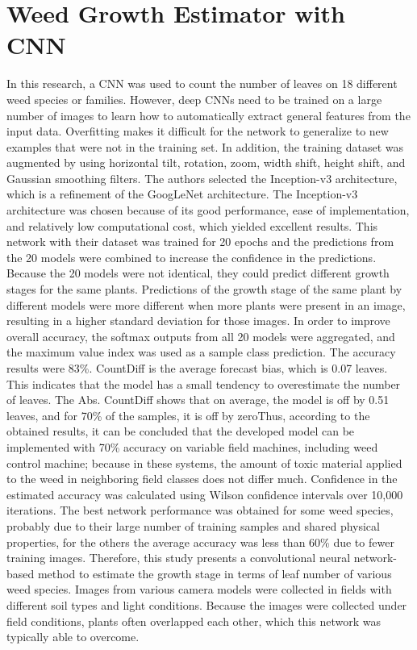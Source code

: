 \section {Weed Growth Estimator with CNN}
In this research, a CNN was used to count the number of leaves on 18 different weed species or families. However, deep CNNs need to be trained on a large number of images
to learn how to automatically extract general features from the input data. Overfitting makes it difficult for the network to generalize to new examples that were not in
the training set. In addition, the training dataset was augmented by using horizontal tilt, rotation, zoom, width shift, height shift, and Gaussian smoothing filters. The
authors selected the Inception-v3 architecture, which is a refinement of the GoogLeNet architecture. The Inception-v3 architecture was chosen because of its good
performance, ease of implementation, and relatively low computational cost, which yielded excellent results. This network with their dataset was trained for 20 epochs
and the predictions from the 20 models were combined to increase the confidence in the predictions. Because the 20 models were not identical, they could predict different
growth stages for the same plants. Predictions of the growth stage of the same plant by different models were more different when more plants were present in an image,
resulting in a higher standard deviation for those images. In order to improve overall accuracy, the softmax outputs from all 20 models were aggregated, and the maximum
value index was used as a sample class prediction. The accuracy results were 83\%. CountDiff is the average forecast bias, which is 0.07 leaves. This indicates that the
model has a small tendency to overestimate the number of leaves. The Abs. CountDiff shows that on average, the model is off by 0.51 leaves, and for 70\% of the samples,
it is off by zeroThus, according to the obtained results, it can be concluded that the developed model can be implemented with 70\% accuracy on variable field machines,
including weed control machine; because in these systems, the amount of toxic material applied to the weed in neighboring field classes does not differ much. Confidence
in the estimated accuracy was calculated using Wilson confidence intervals over 10,000 iterations. The best network performance was obtained for some weed species, probably
due to their large number of training samples and shared physical properties, for the others the average accuracy was less than 60\% due to fewer training images. Therefore,
this study presents a convolutional neural network-based method to estimate the growth stage in terms of leaf number of various weed species. Images from various camera
models were collected in fields with different soil types and light conditions. Because the images were collected under field conditions, plants often overlapped each
other, which this network was typically able to overcome.

